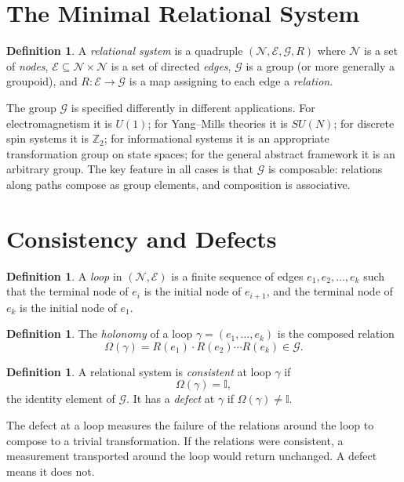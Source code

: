 \documentclass[12pt,a4paper,openany]{book}
\theoremstyle{plain}
\theoremstyle{definition}
\newtheorem{definition}[theorem]{Definition}
\theoremstyle{remark}
\newcommand{\GG}{\mathcal{G}}
\newcommand{\NN}{\mathcal{N}}
\newcommand{\EE}{\mathcal{E}}
\newcommand{\ZZ}{\mathbb{Z}}
\newcommand{\id}{\mathbb{I}}
\newcommand{\defect}{\Omega}
\begin{document}
\section{The Minimal Relational System}

\begin{definition}
A \emph{relational system} is a quadruple $(\NN, \EE, \GG, R)$ where $\NN$ is a set of \emph{nodes}, $\EE \subseteq \NN \times \NN$ is a set of directed \emph{edges}, $\GG$ is a group (or more generally a groupoid), and $R : \EE \to \GG$ is a map assigning to each edge a \emph{relation}.
\end{definition}

The group $\GG$ is specified differently in different applications. For electromagnetism it is $U(1)$; for Yang--Mills theories it is $SU(N)$; for discrete spin systems it is $\ZZ_2$; for informational systems it is an appropriate transformation group on state spaces; for the general abstract framework it is an arbitrary group. The key feature in all cases is that $\GG$ is composable: relations along paths compose as group elements, and composition is associative.

\section{Consistency and Defects}

\begin{definition}
A \emph{loop} in $(\NN, \EE)$ is a finite sequence of edges $e_1, e_2, \ldots, e_k$ such that the terminal node of $e_i$ is the initial node of $e_{i+1}$, and the terminal node of $e_k$ is the initial node of $e_1$.
\end{definition}

\begin{definition}
The \emph{holonomy} of a loop $\gamma = (e_1, \ldots, e_k)$ is the composed relation
\[
\defect(\gamma) = R(e_1) \cdot R(e_2) \cdots R(e_k) \in \GG.
\]
\end{definition}

\begin{definition}
A relational system is \emph{consistent} at loop $\gamma$ if
\[
\defect(\gamma) = \id,
\]
the identity element of $\GG$. It has a \emph{defect} at $\gamma$ if $\defect(\gamma) \neq \id$.
\end{definition}

The defect at a loop measures the failure of the relations around the loop to compose to a trivial transformation. If the relations were consistent, a measurement transported around the loop would return unchanged. A defect means it does not.
\end{document}
